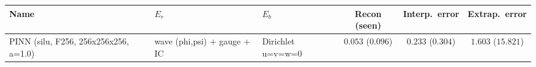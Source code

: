 \begin{center}
\begin{tabular}{lll ccc}
\toprule
Name & $E_r$ & $E_b$ & Recon (seen) & Interp.\ error & Extrap.\ error \\
\midrule
PINN (silu, F256, 256x256x256, a=1.0) & wave (phi,psi) + gauge + IC & Dirichlet u=v=w=0 & $0.053$ ($0.096$) & $0.233$ ($0.304$) & $1.603$ ($15.821$) \\
\bottomrule
\end{tabular}
\end{center}

